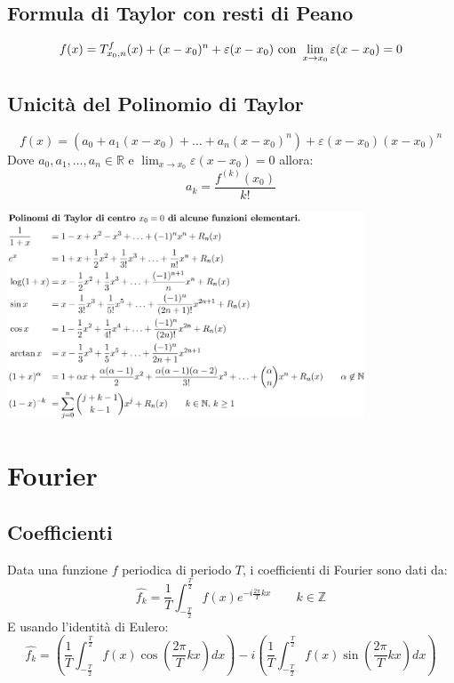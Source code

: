 \documentclass[10pt, a4paper]{article}
\begin{document}
    \subsection{Formula di Taylor con resti di Peano}
        \begin{equation*}
                f(x)= \taylor{f}{x_0}{n}(x) + (x-x_0)^n + \varepsilon(x-x_0) \text{ con } \lim_{x\rightarrow x_0} \varepsilon(x-x_0) = 0
        \end{equation*}
    \subsection{Unicità del Polinomio di Taylor}
    \begin{equation*}
        f(x)=(a_0+a_1(x-x_0)+\ldots+a_n(x-x_0)^n)+\varepsilon(x-x_0)(x-x_0)^n
    \end{equation*}
    Dove $a_0,a_1,\ldots,a_n\in\mathbb{R}$ e $\lim_{x\rightarrow x_0}\varepsilon(x-x_0)=0$ allora:
    \begin{equation*}
        a_k = \frac{f^{(k)}(x_0)}{k!}
    \end{equation*}
    \begin{center}
        \includegraphics[width=0.8\textwidth]{Images/serieditaylor.png}
    \end{center}
\newpage
\section{Fourier}
    \subsection{Coefficienti}
        Data una funzione $f$ periodica di periodo $T$, i coefficienti di Fourier sono dati da:
        \begin{equation*}
            \hat{f_k}=\frac{1}{T}\int_{-\frac{T}{2}}^{\frac{T}{2}}f(x)e^{-i\frac{2\pi}{T}kx} \qquad k\in\mathbb{Z}
        \end{equation*}
        E usando l'identità di Eulero:
        \begin{equation*}
            \hat{f_k}=\left(\frac{1}{T}\int_{-\frac{T}{2}}^{\frac{T}{2}}f(x)\cos\left(\frac{2\pi}{T}kx\right)dx\right)-i\left(\frac{1}{T}\int_{-\frac{T}{2}}^{\frac{T}{2}}f(x)\sin\left(\frac{2\pi}{T}kx\right)dx\right)
        \end{equation*}
\end{document}
